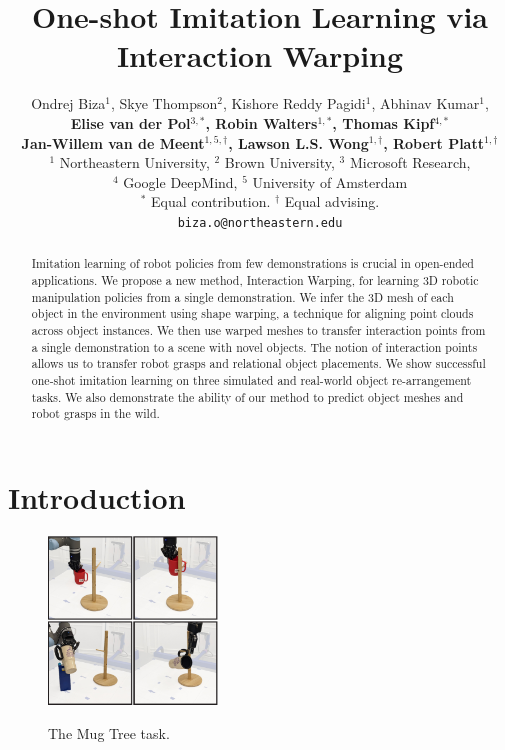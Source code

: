 \documentclass{article}
\title{One-shot Imitation Learning via Interaction Warping}
\author{
  Ondrej Biza$^1$, Skye Thompson$^2$, Kishore Reddy Pagidi$^1$, Abhinav Kumar$^1$, \\
  \textbf{Elise van der Pol$^{3,*}$, Robin Walters$^{1,*}$, Thomas Kipf$^{4,*}$} \\
  \textbf{Jan-Willem van de Meent$^{1,5,\dag}$, Lawson L.S. Wong$^{1,\dag}$, Robert Platt$^{1,\dag}$} \\
  $^1$ Northeastern University, $^2$ Brown University, $^3$ Microsoft Research, \\$^4$ Google DeepMind, $^5$ University of Amsterdam \\
  $^*$ Equal contribution. $^\dag$ Equal advising. \\
  \texttt{biza.o@northeastern.edu} \\
}
\begin{document}
\maketitle


\begin{abstract}
Imitation learning of robot policies from few demonstrations is crucial in open-ended applications. We propose a new method, Interaction Warping, for learning 3D robotic manipulation policies from a single demonstration. We infer the 3D mesh of each object in the environment using shape warping, a technique for aligning point clouds across object instances. 
We then use warped meshes to transfer interaction points from a single demonstration to a scene with novel objects. The notion of interaction points allows us to transfer robot grasps and relational object placements. 
We show successful one-shot imitation learning on three simulated and real-world object re-arrangement tasks. We also demonstrate the ability of our method to predict object meshes and robot grasps in the wild.
\end{abstract}



\section{Introduction}

\begin{figure}
\vspace{-0.5cm}
  \begin{center}
    \includegraphics[width=0.4\textwidth]{figures/intro_2.pdf} \\
    \end{center}
\vspace{-0.2cm}
\caption{The Mug Tree task.}
\label{fig:mugontree}
\end{figure}
\end{document}
